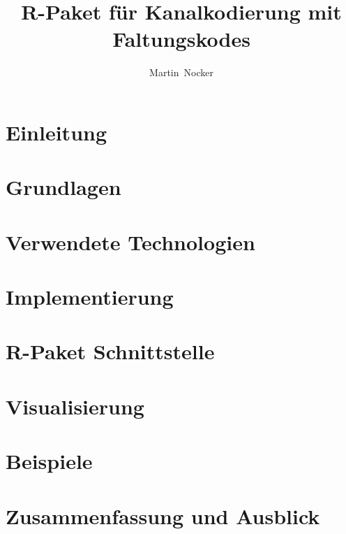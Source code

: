\documentclass[germanthesis]{thesis-style}
\author{Martin~Nocker}
\title{R-Paket für Kanalkodierung mit Faltungskodes}
\begin{document}
\maketitle

\begin{abstract}

\end{abstract}

\tableofcontents
\clearpage
{}

\chapter{Einleitung}
\label{kapitel:einleitung}


\chapter{Grundlagen}
\label{kapitel:grundlagen}


\chapter{Verwendete Technologien}
\label{kapitel:technologien}


\chapter{Implementierung}
\label{kapitel:implementierung}


\chapter{R-Paket Schnittstelle}
\label{kapitel:interface}


\chapter{Visualisierung}
\label{kapitel:visualisierung}


\chapter{Beispiele}
\label{kapitel:beispiele}


\chapter{Zusammenfassung und Ausblick}
\label{kapitel:fazit}

\end{document}
